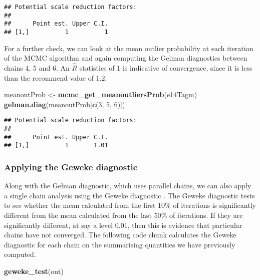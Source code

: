 \documentclass[9pt,a4paper,]{extarticle}
\newenvironment{Shaded}{\begin{snugshade}}{\end{snugshade}}
\newcommand{\DecValTok}[1]{\textcolor[rgb]{0.00,0.00,0.81}{#1}}
\newcommand{\KeywordTok}[1]{\textcolor[rgb]{0.13,0.29,0.53}{\textbf{#1}}}
\newcommand{\NormalTok}[1]{#1}
\newcommand{\StringTok}[1]{\textcolor[rgb]{0.31,0.60,0.02}{#1}}
\begin{document}
\begin{verbatim}
## Potential scale reduction factors:
## 
##      Point est. Upper C.I.
## [1,]          1          1
\end{verbatim}

For a further check, we can look at the mean outlier probability at
each iteration of the MCMC algorithm and again computing the Gelman
diagnostics between chains 4, 5 and 6. An \(\hat{R}\) statistics of
1 is indicative of convergence, since it is less than the recommend
value of 1.2.

\begin{Shaded}
\begin{Highlighting}[]
\NormalTok{meanoutProb <-}\StringTok{ }\KeywordTok{mcmc_get_meanoutliersProb}\NormalTok{(e14Tagm)}
\KeywordTok{gelman.diag}\NormalTok{(meanoutProb[}\KeywordTok{c}\NormalTok{(}\DecValTok{3}\NormalTok{, }\DecValTok{5}\NormalTok{, }\DecValTok{6}\NormalTok{)])}
\end{Highlighting}
\end{Shaded}

\begin{verbatim}
## Potential scale reduction factors:
## 
##      Point est. Upper C.I.
## [1,]          1       1.01
\end{verbatim}

\hypertarget{applying-the-geweke-diagnostic}{%
\subsubsection{Applying the Geweke diagnostic}\label{applying-the-geweke-diagnostic}}

Along with the Gelman diagnostic, which uses parallel chains, we can
also apply a single chain analysis using the Geweke diagnostic \citep{Geweke:1992}. The
Geweke diagnostic tests to see whether the mean calculated from the
first \(10\%\) of iterations is significantly different from the
mean calculated from the last \(50\%\) of iterations. If they are
significantly different, at say a level 0.01, then this is evidence
that particular chains have not converged. The following code chunk
calculates the Geweke diagnostic for each chain on the summarising
quantities we have previously computed.

\begin{Shaded}
\begin{Highlighting}[]
\KeywordTok{geweke_test}\NormalTok{(out)}
\end{Highlighting}
\end{Shaded}
\end{document}
